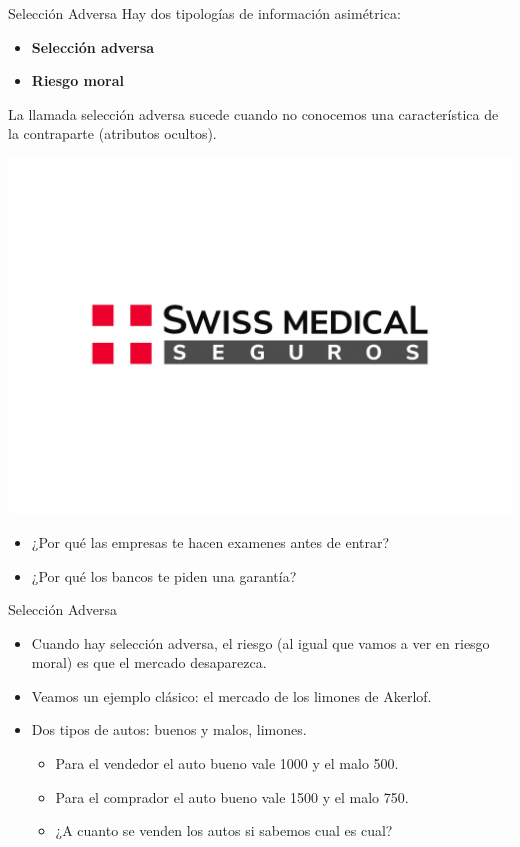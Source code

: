 \documentclass{beamer}
\begin{document}
\begin{frame}{Selección Adversa}
    Hay dos tipologías de información asimétrica:
    \begin{itemize}
        \item \textbf{Selección adversa}
        \item \textbf{Riesgo moral}
    \end{itemize}
    \begin{boxA}
        \centering
        La llamada selección adversa sucede cuando no conocemos una característica de la contraparte (atributos ocultos).
    \end{boxA}
    \vspace{-2mm}
    \centering
    \includegraphics[scale=0.05]{../Figures/Swiss_Medical_Logo.jpg}
    \vspace{-10mm}
    \begin{itemize}
        \item ¿Por qué las empresas te hacen examenes antes de entrar?
        \item ¿Por qué los bancos te piden una garantía?
    \end{itemize}
\end{frame}

\begin{frame}{Selección Adversa}
    \begin{itemize}
        \item Cuando hay selección adversa, el riesgo (al igual que vamos a ver en riesgo moral) es que el mercado desaparezca.
        \item Veamos un ejemplo clásico: el mercado de los limones de Akerlof.
        \item Dos tipos de autos: buenos y malos, limones.
        \begin{itemize}
            \item Para el vendedor el auto bueno vale 1000 y el malo 500.
            \item Para el comprador el auto bueno vale 1500 y el malo 750.
            \item ¿A cuanto se venden los autos si sabemos cual es cual?
        \end{itemize}
    \end{itemize}
\end{frame}
\end{document}
